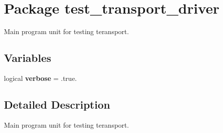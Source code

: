 \hypertarget{a00095}{
\section{Package test\_\-transport\_\-driver}
\label{a00095}
}
Main program unit for testing teransport.  


\subsection*{Variables}
\begin{CompactItemize}
\item 
\hypertarget{a00095_92eb569f93187553d8f26e8be117b3d4}{
logical \textbf{verbose} = .true.}
\label{a00095_92eb569f93187553d8f26e8be117b3d4}

\end{CompactItemize}


\subsection{Detailed Description}
Main program unit for testing teransport. 

